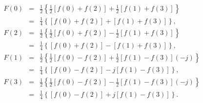 \begin{eqnarray}
F(0) &=& \frac{1}{2} 
  \left \{ 
    \frac{1}{2} \left [ f(0) + f(2) \right ] + \frac{1}{2} \left [ f(1) + f(3) \right ]
  \right \} \nonumber \\
     &=& \frac{1}{4}
  \left \{ 
    \left [ f(0) + f(2) \right ] + \left [ f(1) + f(3) \right ]
  \right \}
\textrm{,}\\
F(2) &=& \frac{1}{2} 
  \left \{ 
    \frac{1}{2} \left [ f(0) + f(2) \right ] - \frac{1}{2} \left [ f(1) + f(3) \right ]
  \right \} \nonumber \\
     &=& \frac{1}{4}
  \left \{ 
    \left [ f(0) + f(2) \right ] - \left [ f(1) + f(3) \right ]
  \right \}
\textrm{,}\\
F(1) &=& \frac{1}{2} 
  \left \{ 
    \frac{1}{2} \left [ f(0) - f(2) \right ] + \frac{1}{2} \left [ f(1) - f(3) \right ] (-j)
  \right \} \nonumber \\
     &=& \frac{1}{4}
  \left \{ 
    \left [ f(0) - f(2) \right ] - j \left [ f(1) - f(3) \right ]
  \right \}
\textrm{,}\\
F(3) &=& \frac{1}{2} 
  \left \{ 
    \frac{1}{2} \left [ f(0) - f(2) \right ] - \frac{1}{2} \left [ f(1) - f(3) \right ] (-j)
  \right \} \nonumber \\
     &=& \frac{1}{4}
  \left \{ 
    \left [ f(0) - f(2) \right ] + j \left [ f(1) - f(3) \right ]
  \right \}
\textrm{.}
\end{eqnarray}
